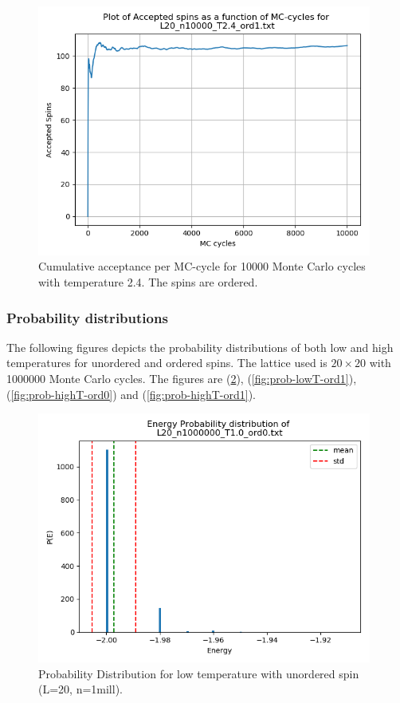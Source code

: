 \documentclass{article}
\begin{document}
  \begin{figure}[ht]
      \centering
      \includegraphics[width = 11cm]{img/accept_L20_n10000_T24_ord1.png}
      \caption{Cumulative acceptance per MC-cycle for 10000 Monte Carlo cycles with temperature 2.4. The spins are ordered. }
      \label{fig:accept_L20_n10000_T2.4_ord1}
    \end{figure}

\subsubsection{Probability distributions} \label{sec:probabilitydistributions}

The following figures depicts the probability distributions of both low and high temperatures for unordered and ordered spins. The lattice used is $20 \times 20$ with 1000000 Monte Carlo cycles. The figures are (\ref{fig:prob-lowT-ord0}), (\ref{fig:prob-lowT-ord1}), (\ref{fig:prob-highT-ord0}) and (\ref{fig:prob-highT-ord1}). \\

  \begin{figure}[ht]
      \centering
      \includegraphics[width = 11cm]{img/energyhistogram_L20_n1000000_T10_ord0.png}
      \caption{Probability Distribution for low temperature with unordered spin (L=20, n=1mill).}
      \label{fig:prob-lowT-ord0}
    \end{figure}
\end{document}
